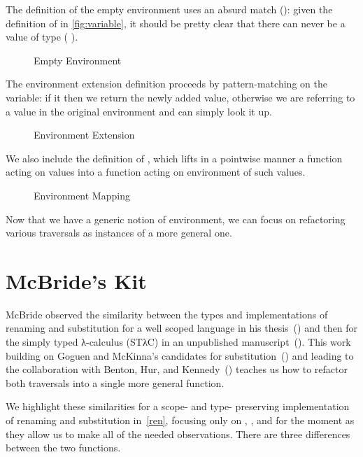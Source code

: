 \label{fig:envcombinators}

The definition of the empty environment uses an absurd match (\AS{()}): given
the definition of  in \cref{fig:variable}, it should be pretty clear
that there can never be a value of type ({  \AIC{[]}}).

\begin{figure}[h]
\caption{Empty Environment\label{fig:emptyenv}}
\end{figure}

The environment extension definition proceeds by pattern-matching on the
variable: if it  then we return the newly added value, otherwise we are
referring to a value in the original environment and can simply look it up.

\begin{figure}[h]
\caption{Environment Extension\label{fig:envextend}}
\end{figure}

We also include the definition of \AF{\_<\$>\_}, which lifts in a
pointwise manner a function acting on values into a function acting
on environment of such values.

\begin{figure}[h]
\caption{Environment Mapping}\label{fig:baseenv}
\end{figure}

Now that we have a generic notion of environment, we can focus on
refactoring various traversals as instances of a more general one.

\section{McBride's Kit}

McBride observed the similarity between the types and implementations of renaming
and substitution for a well scoped language in his thesis~(\citeyear{mcbride1999})
and then for the simply typed λ-calculus (STλC) in an unpublished
manuscript~(\citeyear{mcbride2005type}). This work building on Goguen and McKinna's
candidates for substitution~(\citeyear{goguen1997candidates}) and leading to the
collaboration with Benton, Hur, and Kennedy~(\citeyear{benton2012strongly}) teaches
us how to refactor both traversals into a single more general function.

We highlight these similarities for a scope- and type- preserving
implementation of renaming and substitution in~\cref{ren}, focusing
only on , , and  for the moment as
they allow us to make all of the needed observations.
%
There are three differences between the two functions.

